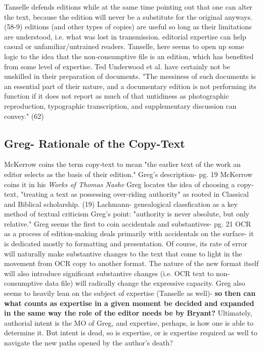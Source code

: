 \documentclass[course, english]{Notes}
\newcommand{\n}{\scalebox{2}{\textbf{\framebox{$\aleph$} } } }
\begin{document}
\begin{outline}
\1 Tanselle defends editions while at the same time pointing out that one can alter the text, because the edition will never be a substitute for the original anyways. (58-9)
	\2 editions (and other types of copies) are useful so long as their limitations are understood, i.e. what was lost in transmission.
	\2 editorial expertise can help casual or unfamiliar/untrained readers.
	\2 \n Tanselle, here seems to open up some logic to the idea that the non-consumptive file is an edition, which has benefited from some level of expertise. Ted Underwood et al. have certainly not be unskilled in their preparation of documents. 
\1 "The messiness of such documents is an essential part of their nature, and a documentary edition is not performing its function if it does not report as much of that untidiness as photographic reproduction, typographic transcription, and supplementary discussion can convey." (62)
 \end{outline}
 
\subsection{Greg- Rationale of the Copy-Text}
\begin{outline}
\1  McKerrow coins the term copy-text to mean "the earlier text of the work an editor selects as the basis of their edition." Greg's description- pg. 19
	\2 McKerrow coins it in his \textit{Works of Thomas Nashe}
\1 Greg locates the idea of choosing a copy-text, "treating a text as possessing over-riding authority" as rooted in Classical and Biblical scholarship. (19)
\1 Lachmann- genealogical classfication as a key method of textual criticism
\1 Greg's point: "authority is never absolute, but only relative."
\1 Greg seems the first to coin accidentals and substantives- pg. 21
	\2 \n OCR as a process of edition-making deals primarily with accidentals on the surface- it is dedicated mostly to formatting and presentation. Of course, its rate of error will naturally make substantive changes to the text that come to light in the movement from OCR copy to another format. The nature of the new format itself will also introduce significant substantive changes (i.e. OCR text to non-consumptive data file) will radically change the expressive capacity.
\1 Greg also seems to heavily lean on the subject of expertise (Tanselle as well)- \textbf{so then can what counts as expertise in a given moment be decided and expanded in the same way the role of the editor needs be by Bryant?}
\1 Ultimately, authorial intent is the MO of Greg, and expertise, perhaps, is how one is able to determine it. 
	\2 But intent is dead, so is expertise, or is expertise required as well to navigate the new paths opened by the author's death? 
\end{outline}
\end{document}
